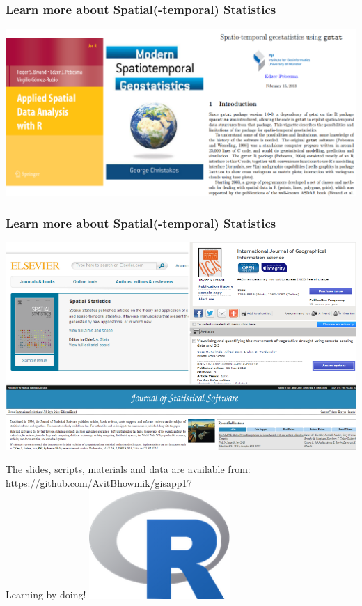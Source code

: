 \documentclass{beamer}
\begin{document}
\begin{frame}
\frametitle{Learn more about Spatial(-temporal) Statistics}
\centering
\includegraphics[width=\textwidth]{Figures/books.png}
\end{frame}


\begin{frame}
\frametitle{Learn more about Spatial(-temporal) Statistics}
\centering
\includegraphics[width=\textwidth]{Figures/journals.png}
\end{frame}


\begin{frame}
\centering
The slides, scripts, materials and data are available from:\\
\href{https://github.com/AvitBhowmik/gisapp17}{\alert{https://github.com/AvitBhowmik/gisapp17}}\\
\vspace{1cm}
\Huge Learning by doing!
\includegraphics[width=0.4\textwidth]{Figures/Rlogo.png}
\end{frame}
\end{document}

